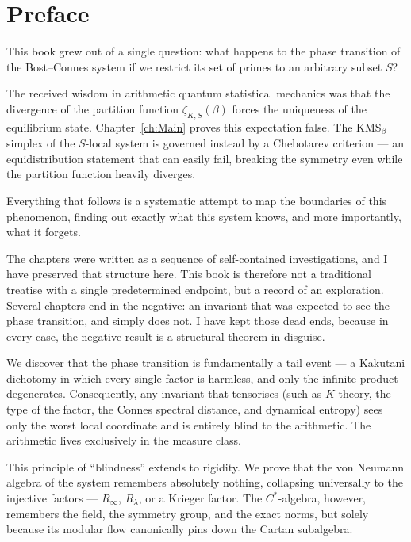 \chapter*{Preface}

This book grew out of a single question: what happens to the phase transition of the
Bost--Connes system if we restrict its set of primes to an arbitrary subset $S$?

The received wisdom in arithmetic quantum statistical mechanics was that the divergence of
the partition function $\zeta_{K,S}(\beta)$ forces the uniqueness of the equilibrium state.
Chapter~\ref{ch:Main} proves this expectation false. The $\mathrm{KMS}_\beta$ simplex of
the $S$-local system is governed instead by a Chebotarev criterion --- an equidistribution
statement that can easily fail, breaking the symmetry even while the partition function
heavily diverges.

Everything that follows is a systematic attempt to map the boundaries of this phenomenon,
finding out exactly what this system knows, and more importantly, what it forgets.

The chapters were written as a sequence of self-contained investigations, and I have
preserved that structure here. This book is therefore not a traditional treatise with a
single predetermined endpoint, but a record of an exploration. Several chapters end in the
negative: an invariant that was expected to see the phase transition, and simply does not.
I have kept those dead ends, because in every case, the negative result is a structural
theorem in disguise.

We discover that the phase transition is fundamentally a tail event --- a Kakutani
dichotomy in which every single factor is harmless, and only the infinite product
degenerates. Consequently, any invariant that tensorises (such as $K$-theory, the type of
the factor, the Connes spectral distance, and dynamical entropy) sees only the worst local
coordinate and is entirely blind to the arithmetic. The arithmetic lives exclusively in
the measure class.

This principle of ``blindness'' extends to rigidity. We prove that the von Neumann algebra
of the system remembers absolutely nothing, collapsing universally to the injective
factors --- $R_\infty$, $R_\lambda$, or a Krieger factor. The $C^*$-algebra, however,
remembers the field, the symmetry group, and the exact norms, but solely because its
modular flow canonically pins down the Cartan subalgebra.

